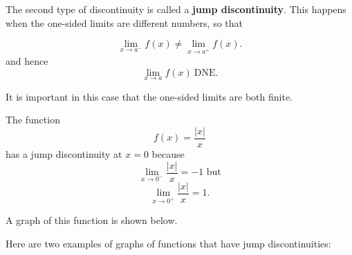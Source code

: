 \documentclass{ximera}
\begin{document}
The second type of discontinuity is called a \textbf{jump discontinuity}. 
This happens when the one-sided
limits are different numbers, so that

\[\lim_{x \to a^-} f(x) \neq \lim_{x \to a^+} f(x).\]
and hence
\[
\lim_{x \to a} f(x) \ \text{DNE}.
\]

It is important in this case that the one-sided limits are both finite.




\begin{example}[example 4]
The function 
\[f(x) = \frac{|x|}{x}\]
 has a jump discontinuity at $x = 0$ because
\[\lim_{x \to 0^-} \frac{|x|}{x} = -1 \text{  but} \]
\[\lim_{x \to 0^+} \frac{|x|}{x} = 1. \]

A graph of this function is shown below.

\end{example}

Here are two examples of graphs of functions that have jump discontinuities:

\begin{center}
\hspace{1.5 in}
\end{center}
\end{document}
